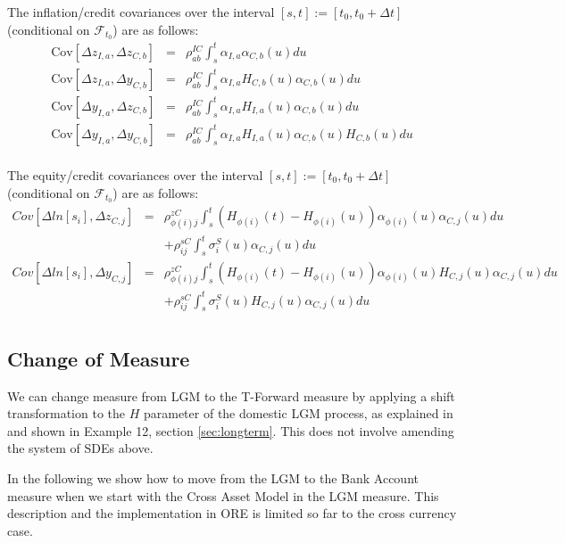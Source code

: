 \documentclass[12pt, a4paper]{article}
\begin{document}
{{\begin{appendix}
The inflation/credit covariances over the interval $[s,t] := [t_0, t_0+\Delta t]$ (conditional on $\mathcal{F}_{t_0}$) are as follows:
\begin{eqnarray*}
  \mathrm{Cov}[ \Delta z_{I,a}, \Delta z_{C,b} ] &=&
  \rho_{ab}^{IC}\int_s^t \alpha_{I,a} \alpha_{C,b}(u) du\\
  \mathrm{Cov}[ \Delta z_{I,a}, \Delta y_{C,b} ] &=&
  \rho_{ab}^{IC}\int_s^t \alpha_{I,a} H_{C,b}(u) \alpha_{C,b}(u) du\\
  \mathrm{Cov}[ \Delta y_{I,a}, \Delta z_{C,b} ] &=&
  \rho_{ab}^{IC}\int_s^t \alpha_{I,a} H_{I,a}(u) \alpha_{C,b}(u) du\\
  \mathrm{Cov}[ \Delta y_{I,a}, \Delta y_{C,b} ] &=&
  \rho_{ab}^{IC}\int_s^t \alpha_{I,a} H_{I,a}(u) \alpha_{C,b}(u) H_{C,b}(u) du\\
\end{eqnarray*}

The equity/credit covariances over the interval $[s,t] := [t_0, t_0+\Delta t]$ (conditional on $\mathcal{F}_{t_0}$) are as follows:
\begin{eqnarray*}
	Cov \left[\Delta ln[s_i], \Delta z_{C,j} \right] &=&
	\rho_{\phi(i)j}^{zC} \int_s^t (H_{\phi(i)} (t) - H_{\phi(i)} (u)) \alpha_{\phi(i)} (u) \alpha_{C,j} (u) du\\
	&&+ \rho_{ij}^{sC} \int_s^t \sigma_i^S (u) \alpha_{C,j} (u) du\\	
	Cov \left[\Delta ln[s_i], \Delta y_{C,j} \right] &=&
	\rho_{\phi(i)j}^{zC} \int_s^t (H_{\phi(i)} (t) - H_{\phi(i)} (u)) \alpha_{\phi(i)} (u) H_{C,j} (u) \alpha_{C,j} (u) du\\
	&&+ \rho_{ij}^{sC} \int_s^t \sigma_i^S (u) H_{C,j} (u) \alpha_{C,j} (u) du\\
\end{eqnarray*}

\subsection{Change of Measure}

We can change measure from LGM to the T-Forward measure by applying a shift transformation to the $H$ parameter of the domestic LGM process, as explained in \cite{Lichters} and shown in Example 12, section \ref{sec:longterm}. This does not involve amending the system of SDEs above.

\medskip
\noindent
In the following we show how to move from the LGM to the Bank Account measure when we start with the Cross Asset Model in the LGM measure. This description and the implementation in ORE is limited so far to the cross currency case.


\end{appendix}}}
\end{document}
